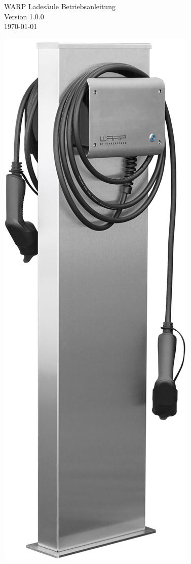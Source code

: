 \documentclass[a4paper,10pt]{article}
\title{}
\author{}
\begin{document}
\pagestyle{empty}
\begin{titlepage}
	\vspace*{-3.08cm}
	\colorbox{boxgray}{}
	\vfill
	\begin{center}
		\Huge
		WARP Ladesäule Betriebsanleitung\\\vspace{1cm}
		\large
		Version 1.0.0\\\vspace{0.25cm}
		\today
	\end{center}
	\vfill
	\begin{center}
		\includegraphics[width=0.3\linewidth]{./img/warp-charger-stand-side}
	\end{center}
\end{titlepage}
\newpage
\null
\newpage
\pagestyle{fancy}
\end{document}
